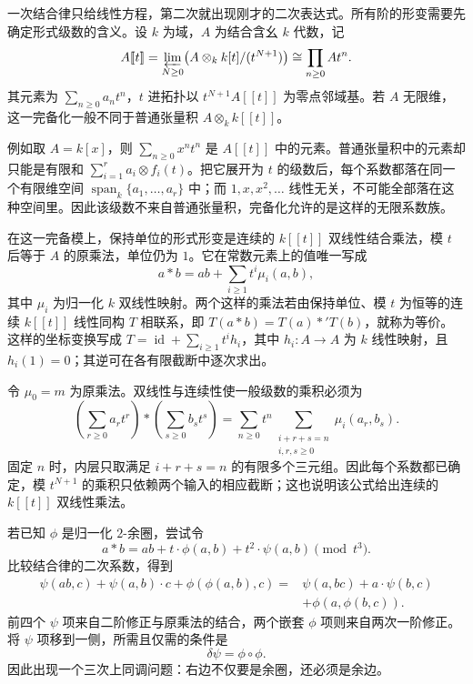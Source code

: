 一次结合律只给线性方程，第二次就出现刚才的二次表达式。所有阶的形变需要先确定形式级数的含义。设 \(k\) 为域，\(A\) 为结合含幺 \(k\) 代数，记
\[
	A[\![t]\!] =\varprojlim_{N\ge0}\bigl(A\otimes_k k[t]/(t^{N+1})\bigr) \cong\prod_{n\ge0}At^n.
\]
其元素为 \(\sum_{n\ge0}a_nt^n\)，\(t\) 进拓扑以 \(t^{N+1}A[\![t]\!]\) 为零点邻域基。若 \(A\) 无限维，这一完备化一般不同于普通张量积 \(A\otimes_k k[\![t]\!]\)。

\ProseParagraphBreak

例如取 \(A=k[x]\)，则 \(\sum_{n\ge0}x^nt^n\) 是 \(A[\![t]\!]\) 中的元素。普通张量积中的元素却只能是有限和 \(\sum_{i=1}^r a_i\otimes f_i(t)\)。把它展开为 \(t\) 的级数后，每个系数都落在同一个有限维空间 \(\operatorname{span}_k\{a_1,\ldots,a_r\}\) 中；而 \(1,x,x^2,\ldots\) 线性无关，不可能全部落在这种空间里。因此该级数不来自普通张量积，完备化允许的是这样的无限系数族。

\ProseParagraphBreak
在这一完备模上，保持单位的形式形变是连续的 \(k[\![t]\!]\) 双线性结合乘法，模 \(t\) 后等于 \(A\) 的原乘法，单位仍为 \(1\)。它在常数元素上的值唯一写成
\[
	a*b=ab+\sum_{i\ge1}t^i\mu_i(a,b),
\]
其中 \(\mu_i\) 为归一化 \(k\) 双线性映射。两个这样的乘法若由保持单位、模 \(t\) 为恒等的连续 \(k[\![t]\!]\) 线性同构 \(T\) 相联系，即 \(T(a*b)=T(a)*'T(b)\)，就称为等价。这样的坐标变换写成 \(T=\operatorname{id}+\sum_{i\ge1}t^ih_i\)，其中 \(h_i:A\to A\) 为 \(k\) 线性映射，且 \(h_i(1)=0\)；其逆可在各有限截断中逐次求出。

\ProseParagraphBreak
令 \(\mu_0=m\) 为原乘法。双线性与连续性使一般级数的乘积必须为
\[
	\left(\sum_{r\ge0}a_rt^r\right)* \left(\sum_{s\ge0}b_st^s\right) =\sum_{n\ge0}t^n \sum_{\substack{i+r+s=n\\i,r,s\ge0}}\mu_i(a_r,b_s).
\]
固定 \(n\) 时，内层只取满足 \(i+r+s=n\) 的有限多个三元组。因此每个系数都已确定，模 \(t^{N+1}\) 的乘积只依赖两个输入的相应截断；这也说明该公式给出连续的 \(k[\![t]\!]\) 双线性乘法。

\ProseParagraphBreak
若已知 \(\phi\) 是归一化 \(2\)-余圈，尝试令
\[
	a*b=ab+t\cdot\phi(a,b)+t^2\cdot\psi(a,b)\pmod {t^3}.
\]
比较结合律的二次系数，得到
\[
	\begin{aligned}
		\psi(ab,c)+\psi(a,b)\cdot c+\phi(\phi(a,b),c) ={}&\psi(a,bc)+a\cdot\psi(b,c)\\
		&+\phi(a,\phi(b,c)).
	\end{aligned}
\]
前四个 \(\psi\) 项来自二阶修正与原乘法的结合，两个嵌套 \(\phi\) 项则来自两次一阶修正。将 \(\psi\) 项移到一侧，所需且仅需的条件是
\begin{equation}\label{b4:eq:second-deformation-obstruction}
	\delta\psi=\phi\circ\phi.
\end{equation}
因此出现一个三次上同调问题：右边不仅要是余圈，还必须是余边。

